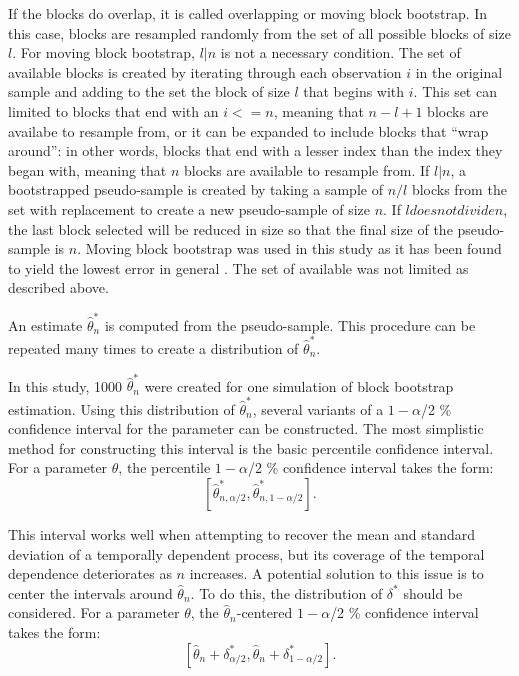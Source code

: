 \documentclass[12pt, letterpaper, titlepage]{article}
\begin{document}
If the blocks do overlap, it is called overlapping or moving block bootstrap.
In this case, blocks are resampled randomly from the set of all possible
blocks of size $l$. For moving block bootstrap, $l \vert n$ is not a necessary
condition. The set of available blocks is created by iterating through each
observation $i$ in the original sample and adding to the set the block of size
$l$ that begins with $i$. This set can limited to blocks that end with an
$i <= n$, meaning that $n - l + 1$ blocks are availabe to resample from, or it
can be expanded to include blocks that ``wrap around'': in
other words, blocks that end with a lesser index than the index they began
with, meaning that $n$ blocks are available to resample from. If $l \vert n$,
a bootstrapped pseudo-sample is created by taking a sample of $n / l$ blocks
from the set with replacement to create a new pseudo-sample of size $n$. If
$l does not divide n$, the last block selected will be reduced in size so that
the final size of the pseudo-sample is $n$. Moving block bootstrap was used in
this study as it has been found to yield the lowest error in general
\citep{radovanov2014comparison}. The set of available was not limited as
described above.

An estimate $\hat\theta_n^*$ is computed from the pseudo-sample. This
procedure can be repeated many times to create a distribution of
$\hat\theta_n^*$. 


In this study, 1000 $\hat\theta_n^*$ were created for one simulation of block
bootstrap estimation. Using this distribution of $\hat\theta_n^*$, several
variants of a $1 - \alpha$/2 \% confidence interval for the parameter can be
constructed. The most simplistic method for constructing this interval is the
basic percentile confidence interval. For a parameter $\theta$, the percentile
$1 - \alpha$/2 \% confidence interval takes the form: 
\[ [\hat\theta_{n, \alpha/2}^*, \hat\theta_{n, 1 - \alpha/2}^*].\] 
	
This interval works well when attempting to recover the mean and
standard deviation of a temporally dependent process, but its coverage of
the temporal dependence deteriorates as $n$ increases. A potential solution to
this issue is to center the intervals around $\hat{\theta}_{n}$. To do this,
the distribution of $\delta^*$ should be considered. For a parameter $\theta$,
the $\hat{\theta}_{n}$-centered $1 - \alpha$/2 \% confidence interval takes
the form:
\[ [\hat{\theta}_{n} + \delta^*_{\alpha/2},
  \hat{\theta}_{n} + \delta^*_{1 - \alpha/2}].\] 
  
\end{document}
